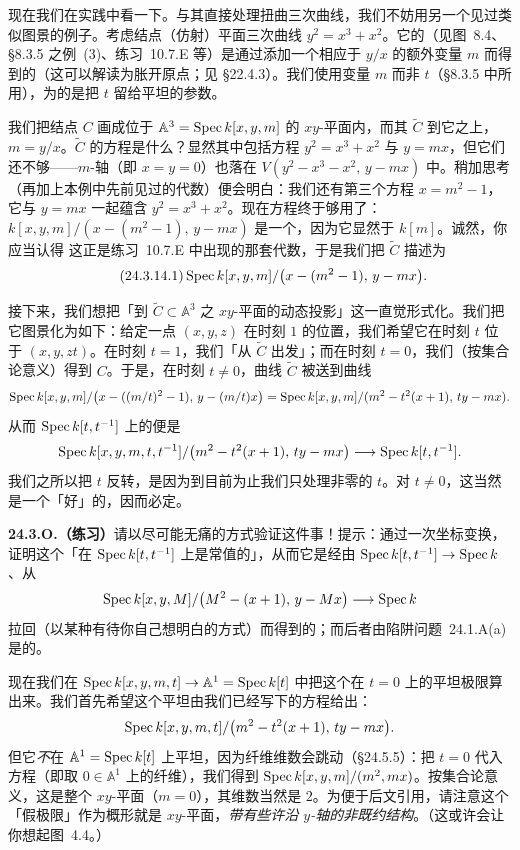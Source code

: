 现在我们在实践中看一下。与其直接处理扭曲三次曲线，我们不妨用另一个见过类似图景的例子。考虑结点（仿射）平面三次曲线 $y^2=x^3+x^2$。它的\trNormalization（见\mbox{图~8.4}、\S8.3.5 之\mbox{例~(3)}、\mbox{练习~10.7.E} 等）是通过添加一个相应于 $y/x$ 的额外变量 $m$ 而得到的（这可以解读为胀开原点；见 \S22.4.3）。我们使用变量 $m$ 而非 $t$（\S8.3.5 中所用），为的是把 $t$ 留给平坦\trFamily{}的参数。

我们把结点\trCurve{} $C$ 画成位于 $\mathbb{A}^3=\operatorname{Spec} k[x,y,m]$ 的 $xy$-平面内，而其\trNormalization{} $\widetilde{C}$ \trProjection{}到它之上，$m=y/x$。$\widetilde{C}$ 的方程是什么？显然其中包括方程 $y^2=x^3+x^2$ 与 $y=mx$，但它们还不够——$m$-轴（即 $x=y=0$）也落在 $V(y^2-x^3-x^2,\,y-mx)$ 中。稍加思考（再加上本例中先前见过的代数）便会明白：我们还有第三个方程 $x=m^2-1$，它与 $y=mx$ 一起蕴含 $y^2=x^3+x^2$。现在方程终于够用了：$k[x,y,m]/(x-(m^2-1),\,y-mx)$ 是一个\trIntegralDomain，因为它显然\trIsomorphic{}于 $k[m]$。诚然，你应当认得
这正是\mbox{练习~10.7.E} 中出现的那套代数，于是我们把 $\widetilde{C}$ 描述为
\[
\tag{24.3.14.1}\label{eq:nodal-normalization}
\operatorname{Spec} k[x,y,m]/\bigl(x-(m^2-1),\,y-mx\bigr).
\]

接下来，我们想把「到 $\widetilde{C}\subset\mathbb{A}^3$ 之 $xy$-平面的动态投影」这一直觉形式化。我们把它图景化为如下：给定一点 $(x,y,z)$ 在时刻 $1$ 的位置，我们希望它在时刻 $t$ 位于 $(x,y,zt)$。在时刻 $t=1$，我们「从 $\widetilde{C}$ 出发」；而在时刻 $t=0$，我们（按集合论意义）得到 $C$。于是，在时刻 $t\ne 0$，曲线 $\widetilde{C}$ 被送到曲线
\[
\operatorname{Spec} k[x,y,m]/\bigl(x-((m/t)^2-1),\,y-(m/t)x\bigr)=\operatorname{Spec} k[x,y,m]/(m^2-t^2(x+1),\,ty-mx).
\]
从而 $\operatorname{Spec} k[t,t^{-1}]$ 上的\trFamily{}便是
\[
\operatorname{Spec} k[x,y,m,t,t^{-1}]/\bigl(m^2-t^2(x+1),\,ty-mx\bigr)\longrightarrow\operatorname{Spec} k[t,t^{-1}].
\]
我们之所以把 $t$ 反转，是因为到目前为止我们只处理非零的 $t$。对 $t\ne 0$，这当然是一个「好」的\trFamily，因而必定\trFlat。

\textbf{24.3.O.（练习）}\quad 请以尽可能无痛的方式验证这件事！提示：通过一次坐标变换，证明这个\trFamily{}「在 $\operatorname{Spec} k[t,t^{-1}]$ 上是常值的」，从而它是经由 $\operatorname{Spec} k[t,t^{-1}]\to\operatorname{Spec} k$、从
\[
\operatorname{Spec} k[x,y,M]/\bigl(M^2-(x+1),\,y-Mx\bigr)\longrightarrow\operatorname{Spec} k
\]
拉回（以某种有待你自己想明白的方式）而得到的；而后者由\mbox{陷阱问题~24.1.A}(a) 是\trFlat{}的。

现在我们在 $\operatorname{Spec} k[x,y,m,t]\to\mathbb{A}^1=\operatorname{Spec} k[t]$ 中把这个\trFamily{}在 $t=0$ 上的平坦极限算出来。我们首先希望这个平坦\trFamily{}由我们已经写下的方程给出：
\[
\operatorname{Spec} k[x,y,m,t]/\bigl(m^2-t^2(x+1),\,ty-mx\bigr).
\]
但它\emph{不}在 $\mathbb{A}^1=\operatorname{Spec} k[t]$ 上平坦，因为纤维维数会跳动（\S24.5.5）：把 $t=0$ 代入方程（即取 $0\in\mathbb{A}^1$ 上的纤维），我们得到 $\operatorname{Spec} k[x,y,m]/(m^2,mx)$。按集合论意义，这是整个 $xy$-平面（$m=0$），其维数当然是 $2$。为便于后文引用，请注意这个「假极限」作为概形就是 $xy$-平面，\emph{带有些许沿 $y$-轴的非既约结构}。（这或许会让你想起\mbox{图~4.4}。）

